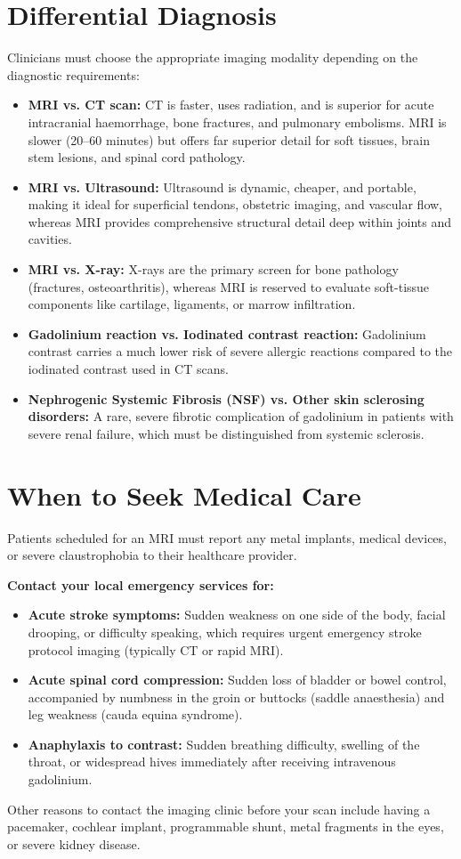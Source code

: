 \section*{Differential Diagnosis}
Clinicians must choose the appropriate imaging modality depending on the diagnostic requirements:
\begin{itemize}
    \item \textbf{MRI vs. CT scan:} CT is faster, uses radiation, and is superior for acute intracranial haemorrhage, bone fractures, and pulmonary embolisms. MRI is slower (20--60 minutes) but offers far superior detail for soft tissues, brain stem lesions, and spinal cord pathology.
    \item \textbf{MRI vs. Ultrasound:} Ultrasound is dynamic, cheaper, and portable, making it ideal for superficial tendons, obstetric imaging, and vascular flow, whereas MRI provides comprehensive structural detail deep within joints and cavities.
    \item \textbf{MRI vs. X-ray:} X-rays are the primary screen for bone pathology (fractures, osteoarthritis), whereas MRI is reserved to evaluate soft-tissue components like cartilage, ligaments, or marrow infiltration.
    \item \textbf{Gadolinium reaction vs. Iodinated contrast reaction:} Gadolinium contrast carries a much lower risk of severe allergic reactions compared to the iodinated contrast used in CT scans.
    \item \textbf{Nephrogenic Systemic Fibrosis (NSF) vs. Other skin sclerosing disorders:} A rare, severe fibrotic complication of gadolinium in patients with severe renal failure, which must be distinguished from systemic sclerosis.
\end{itemize}

\section*{When to Seek Medical Care}
Patients scheduled for an MRI must report any metal implants, medical devices, or severe claustrophobia to their healthcare provider.

\textbf{Contact your local emergency services for:}
\begin{itemize}
    \item \textbf{Acute stroke symptoms:} Sudden weakness on one side of the body, facial drooping, or difficulty speaking, which requires urgent emergency stroke protocol imaging (typically CT or rapid MRI).
    \item \textbf{Acute spinal cord compression:} Sudden loss of bladder or bowel control, accompanied by numbness in the groin or buttocks (saddle anaesthesia) and leg weakness (cauda equina syndrome).
    \item \textbf{Anaphylaxis to contrast:} Sudden breathing difficulty, swelling of the throat, or widespread hives immediately after receiving intravenous gadolinium.
\end{itemize}
Other reasons to contact the imaging clinic before your scan include having a pacemaker, cochlear implant, programmable shunt, metal fragments in the eyes, or severe kidney disease.

